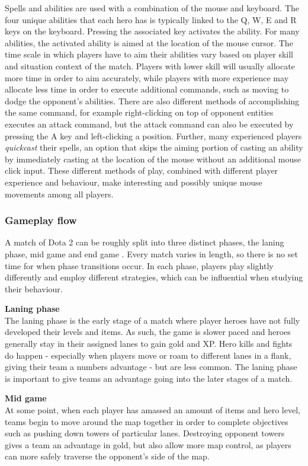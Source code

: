 \documentclass[Report.tex]{subfiles}
\begin{document}
Spells and abilities are used with a combination of the mouse and keyboard. The four unique abilities that each hero has is typically linked to the Q, W, E and R keys on the keyboard. Pressing the associated key activates the ability. For many abilities, the activated ability is aimed at the location of the mouse cursor. The time scale in which players have to aim their abilities vary based on player skill and situation context of the match. Players with lower skill will usually allocate more time in order to aim accurately, while players with more experience may allocate less time in order to execute additional commands, such as moving to dodge the opponent's abilities. There are also different methods of accomplishing the same command, for example right-clicking on top of opponent entities executes an attack command, but the attack command can also be executed by pressing the A key and left-clicking a position. Further, many experienced players \textit{quickcast} their spells, an option that skips the aiming portion of casting an ability by immediately casting at the location of the mouse without an additional mouse click input. These different methods of play, combined with different player experience and behaviour, make interesting and possibly unique mouse movements among all players. 

\subsubsection{Gameplay flow}
A match of Dota 2 can be roughly split into three distinct phases, the laning phase, mid game and end game \cite{dota-phases}. Every match varies in length, so there is no set time for when phase transitions occur. In each phase, players play slightly differently and employ different strategies, which can be influential when studying their behaviour. 

\textbf{Laning phase} \\
The laning phase is the early stage of a match where player heroes have not fully developed their levels and items. As such, the game is slower paced and heroes generally stay in their assigned lanes to gain gold and XP. Hero kills and fights do happen - especially when players move or roam to different lanes in a flank, giving their team a numbers advantage - but are less common. The laning phase is important to give teams an advantage going into the later stages of a match. 

\textbf{Mid game} \\
At some point, when each player has amassed an amount of items and hero level, teams begin to move around the map together in order to complete objectives such as pushing down towers of particular lanes. Destroying opponent towers gives a team an advantage in gold, but also allow more map control, as players can more safely traverse the opponent's side of the map. 
\end{document}
